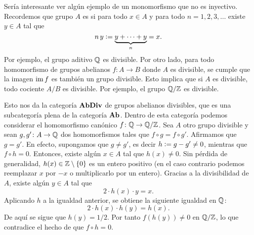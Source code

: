\documentclass{article}
\numberwithin{equation}{section}
\theoremstyle{definition}
\begin{document}
\begin{ejemplo}
  Sería interesante ver algún ejemplo de un monomorfismo que no es inyectivo.
  Recordemos que grupo $A$ es  si para todo $x\in A$ y para todo
  $n = 1,2,3,\ldots$ existe $y\in A$ tal que
  $$n\,y \mathrel{\mathop:}= \underbrace{y + \cdots + y}_n = x.$$
  Por ejemplo, el grupo aditivo $\mathbb{Q}$ es divisible. Por otro lado, para todo
  homomorfismo de grupos abelianos $f\colon A\to B$ donde $A$ es divisible, se
  cumple que la imagen $\operatorname{im} f$ es también un grupo divisible. Esto implica que
  si $A$ es divisible, todo cociente $A/B$ es divisible. Por ejemplo, el grupo
  $\mathbb{Q}/\mathbb{Z}$ es divisible.

  Esto nos da la categoría $\text{\bf AbDiv}$ de grupos abelianos divisibles, que
  es una subcategoría plena de la categoría $\text{\bf Ab}$. Dentro de esta
  categoría podemos considerar el homomorfismo canónico
  $f\colon \mathbb{Q}\to \mathbb{Q}/\mathbb{Z}$. Sea $A$ otro grupo divisible y sean
  $g,g'\colon A\to \mathbb{Q}$ dos homomorfismos tales que $f\circ g = f\circ
  g'$. Afirmamos que $g = g'$. En efecto, supongamos que $g \ne g'$, es decir
  $h\mathrel{\mathop:}= g - g' \ne 0$, mientras que $f\circ h = 0$. Entonces, existe algún
  $x\in A$ tal que $h (x) \ne 0$. Sin pérdida de generalidad,
  $h (x) \in \mathbb{Z}\setminus \{ 0 \}$ es un entero positivo (en el caso contrario
  podemos reemplazar $x$ por $-x$ o multiplicarlo por un entero). Gracias a la
  divisibilidad de $A$, existe algún $y\in A$ tal que
  $$2\cdot h (x)\cdot y = x.$$
  Aplicando $h$ a la igualdad anterior, se obtiene la siguiente igualdad en
  $\mathbb{Q}$:
  $$2\cdot h (x)\cdot h (y) = h (x).$$
  De aquí se sigue que $h (y) = 1/2$. Por tanto $f (h (y)) \ne 0$ en $\mathbb{Q}/\mathbb{Z}$,
  lo que contradice el hecho de que $f\circ h = 0$.
\end{ejemplo}
\end{document}
